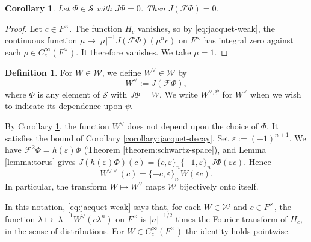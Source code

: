 \documentclass[reqno]{amsart}
\theoremstyle{plain}
\newtheorem{corollary}[theorem]{Corollary}
\theoremstyle{definition}
\newtheorem{definition}[theorem]{Definition}
\theoremstyle{itplain}
\numberwithin{equation}{section}
\numberwithin{theorem}{section}
\begin{document}
\begin{corollary}\label{corollary:line-transform}
  Let $\Phi \in \mathcal{S}$ with $J \Phi = 0$.  Then $J(\mathcal{F} \Phi) = 0$.
\end{corollary}
\begin{proof}
  Let $c \in F^\times$.  The function $H_c$ vanishes, so by \eqref{eq:jacquet-weak}, the continuous function $\mu \mapsto \lvert \mu \rvert^{-1} J(\mathcal{F} \Phi)(\mu^n c)$ on $F^\times$ has integral zero against each $\rho \in C_c^\infty(F^\times)$.  It therefore vanishes.  We take $\mu = 1$.
\end{proof}

\begin{definition}\label{definition:transform}
  For $W \in \mathcal{W}$, we define $W^\vee \in \mathcal{W}$ by
  \begin{equation*}
    W^\vee := J(\mathcal{F} \Phi),
  \end{equation*}
  where $\Phi$ is any element of $\mathcal{S}$ with $J \Phi = W$.  We write $W^{\vee, \psi}$ for $W^\vee$ when we wish to indicate its dependence upon $\psi$.
\end{definition}
By Corollary \ref{corollary:line-transform}, the function $W^\vee$ does not depend upon the choice of $\Phi$.  It satisfies the bound of Corollary \ref{corollary:jacquet-decay}.  Set $\varepsilon := (-1)^{n+1}$.  We have $\mathcal{F}^2 \Phi = h(\varepsilon) \Phi$ (Theorem \ref{theorem:schwartz-space}), and Lemma \ref{lemma:torus} gives $J(h(\varepsilon) \Phi)(c) = \{c, \varepsilon\}_n \{-1, \varepsilon\}_n J \Phi(\varepsilon c)$.  Hence
\begin{equation}\label{eq:jacquet-inversion}
  W^{\vee \vee}(c) = \{-c, \varepsilon\}_n \, W(\varepsilon c).
\end{equation}
In particular, the transform $W \mapsto W^\vee$ maps $\mathcal{W}$ bijectively onto itself.

In this notation, \eqref{eq:jacquet-weak} says that, for each $W \in \mathcal{W}$ and $c \in F^\times$, the function $\lambda \mapsto \lvert \lambda \rvert^{-1} W^\vee(c \lambda^n)$ on $F^\times$ is $\lvert n \rvert^{-1/2}$ times the Fourier transform of $H_c$, in the sense of distributions.  For $W \in C_c^\infty(F^\times)$ the identity holds pointwise.
\end{document}
